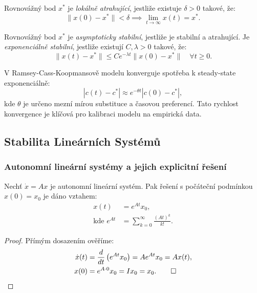 \begin{definition}[Atraktivita]
Rovnovážný bod $x^*$ je \emph{lokálně atrahující}, jestliže existuje $\delta > 0$ takové, že:
\[
\|x(0) - x^*\| < \delta \implies \lim_{t \to \infty} x(t) = x^*.
\]
\end{definition}

\begin{definition}
Rovnovážný bod $x^*$ je \emph{asymptoticky stabilní}, jestliže je stabilní a atrahující. Je \emph{exponenciálně stabilní}, jestliže existují $C, \lambda > 0$ takové, že:
\[
\|x(t) - x^*\| \leq C e^{-\lambda t} \|x(0) - x^*\| \quad \forall t \geq 0.
\]
\end{definition}


\begin{application}
V Ramsey-Cass-Koopmansově modelu konverguje spotřeba k steady-state exponenciálně:
\[
|c(t) - c^*| \approx e^{-\theta t}|c(0) - c^*|,
\]
kde $\theta$ je určeno mezní mírou substituce a časovou preferencí. Tato rychlost konvergence je klíčová pro kalibraci modelu na empirická data.
\end{application}

\spc

\subsection{Stabilita Lineárních Systémů}

\subsubsection{Autonomní lineární systémy a jejich explicitní řešení}

\begin{theorem}
Nechť $\dot{x} = Ax$ je autonomní lineární systém. Pak řešení s počáteční podmínkou $x(0) = x_0$ je dáno vztahem:
\begin{align*}
x(t) &= e^{At}x_0, \\
\text{kde } e^{At} &= \sum_{k=0}^\infty \frac{(At)^k}{k!}.
\end{align*}
\end{theorem}

\begin{proof}
Přímým dosazením ověříme:
\begin{align*}
\dot{x}(t) &= \frac{d}{dt}\left(e^{At}x_0\right) = A e^{At}x_0 = Ax(t), \\
x(0) &= e^{A\cdot 0}x_0 = I x_0 = x_0. \qed
\end{align*}
\end{proof}

